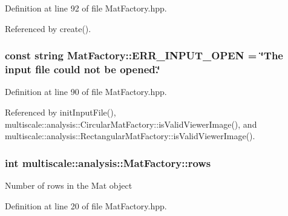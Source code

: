 \-Definition at line 92 of file \-Mat\-Factory.\-hpp.



\-Referenced by create().

\hypertarget{classmultiscale_1_1analysis_1_1MatFactory_a06de250e466b41fcca4fa61a52a575fc}{
\subsubsection[{\-E\-R\-R\-\_\-\-I\-N\-P\-U\-T\-\_\-\-O\-P\-E\-N}]{\setlength{\rightskip}{0pt plus 5cm}const string {\bf \-Mat\-Factory\-::\-E\-R\-R\-\_\-\-I\-N\-P\-U\-T\-\_\-\-O\-P\-E\-N} = \char`\"{}\-The input file could not be opened.\char`\"{}}}\label{classmultiscale_1_1analysis_1_1MatFactory_a06de250e466b41fcca4fa61a52a575fc}


\-Definition at line 90 of file \-Mat\-Factory.\-hpp.



\-Referenced by init\-Input\-File(), multiscale\-::analysis\-::\-Circular\-Mat\-Factory\-::is\-Valid\-Viewer\-Image(), and multiscale\-::analysis\-::\-Rectangular\-Mat\-Factory\-::is\-Valid\-Viewer\-Image().

\hypertarget{classmultiscale_1_1analysis_1_1MatFactory_a35672fb0c992f662018ee7c146794474}{
\subsubsection[{rows}]{\setlength{\rightskip}{0pt plus 5cm}int {\bf multiscale\-::analysis\-::\-Mat\-Factory\-::rows}}}\label{classmultiscale_1_1analysis_1_1MatFactory_a35672fb0c992f662018ee7c146794474}
\-Number of rows in the \-Mat object 

\-Definition at line 20 of file \-Mat\-Factory.\-hpp.



